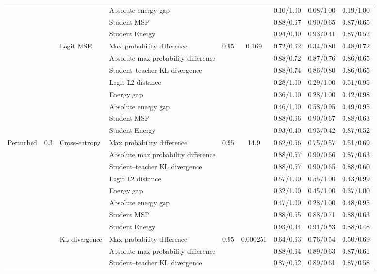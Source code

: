 \documentclass[border=2pt]{standalone}
\begin{document}
\begin{tabular}{llllccccc}
 &  &  & Absolute energy gap &  &  & 0.10/1.00 & 0.08/1.00 & 0.19/1.00 \\
 &  &  & Student MSP &  &  & 0.88/0.67 & 0.90/0.65 & 0.87/0.65 \\
 &  &  & Student Energy &  &  & 0.94/0.40 & 0.93/0.41 & 0.87/0.52 \\
\addlinespace
 &  & Logit MSE & Max probability difference & 0.95 & 0.169 & 0.72/0.62 & 0.34/0.80 & 0.48/0.72 \\
 &  &  & Absolute max probability difference &  &  & 0.88/0.72 & 0.87/0.76 & 0.86/0.65 \\
 &  &  & Student--teacher KL divergence &  &  & 0.88/0.74 & 0.86/0.80 & 0.86/0.65 \\
 &  &  & Logit L2 distance &  &  & 0.28/1.00 & 0.29/1.00 & 0.51/0.95 \\
 &  &  & Energy gap &  &  & 0.36/1.00 & 0.28/1.00 & 0.42/0.98 \\
 &  &  & Absolute energy gap &  &  & 0.46/1.00 & 0.58/0.95 & 0.49/0.95 \\
 &  &  & Student MSP &  &  & 0.88/0.66 & 0.90/0.67 & 0.88/0.63 \\
 &  &  & Student Energy &  &  & 0.93/0.40 & 0.93/0.42 & 0.87/0.52 \\
\midrule
Perturbed & 0.3 & Cross-entropy & Max probability difference & 0.95 & 14.9 & 0.62/0.66 & 0.75/0.57 & 0.51/0.69 \\
 &  &  & Absolute max probability difference &  &  & 0.88/0.67 & 0.90/0.66 & 0.87/0.63 \\
 &  &  & Student--teacher KL divergence &  &  & 0.88/0.67 & 0.90/0.65 & 0.88/0.60 \\
 &  &  & Logit L2 distance &  &  & 0.57/1.00 & 0.55/1.00 & 0.43/0.99 \\
 &  &  & Energy gap &  &  & 0.32/1.00 & 0.45/1.00 & 0.37/1.00 \\
 &  &  & Absolute energy gap &  &  & 0.47/1.00 & 0.28/1.00 & 0.48/0.95 \\
 &  &  & Student MSP &  &  & 0.88/0.65 & 0.88/0.71 & 0.88/0.63 \\
 &  &  & Student Energy &  &  & 0.93/0.44 & 0.91/0.53 & 0.88/0.48 \\
\addlinespace
 &  & KL divergence & Max probability difference & 0.95 & 0.000251 & 0.64/0.63 & 0.76/0.54 & 0.50/0.69 \\
 &  &  & Absolute max probability difference &  &  & 0.88/0.64 & 0.89/0.63 & 0.87/0.61 \\
 &  &  & Student--teacher KL divergence &  &  & 0.87/0.62 & 0.89/0.61 & 0.87/0.58 \\

\end{tabular}
\end{document}

